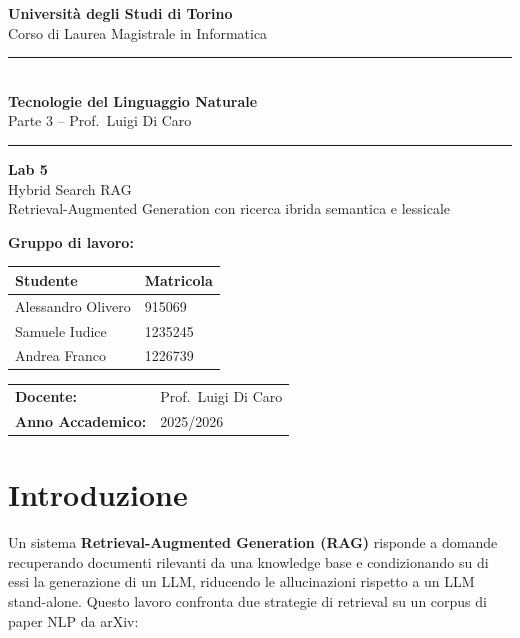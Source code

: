 \documentclass[12pt,a4paper]{article}
\newcommand{\HRule}{\rule{\linewidth}{0.5mm}}
\begin{document}
\raggedbottom

\begin{titlepage}
  \centering
  \vspace*{1.5cm}
  {\Large\textbf{Universit\`a degli Studi di Torino}\\[0.3em]
  Corso di Laurea Magistrale in Informatica}
  \vspace{1cm}
  \HRule\\[0.4em]
  {\LARGE\textbf{Tecnologie del Linguaggio Naturale}}\\[0.3em]
  {\large Parte 3 -- Prof.\ Luigi Di Caro}\\[0.2em]
  \HRule
  \vspace{1.2cm}
  {\huge\textbf{Lab 5}}\\[0.5em]
  {\LARGE Hybrid Search RAG}\\[0.4em]
  {\large Retrieval-Augmented Generation con ricerca ibrida semantica e lessicale}

  \vspace{2cm}
  {\large\textbf{Gruppo di lavoro:}}\\[0.8em]
  \begin{tabular}{ll}
    \toprule
    \textbf{Studente}    & \textbf{Matricola} \\
    \midrule
    Alessandro Olivero   & 915069  \\
    Samuele Iudice       & 1235245 \\
    Andrea Franco        & 1226739 \\
    \bottomrule
  \end{tabular}

  \vspace{1.5cm}
  \begin{tabular}{ll}
    \textbf{Docente:}          & Prof.\ Luigi Di Caro \\[0.3em]
    \textbf{Anno Accademico:}  & 2025/2026 \\
  \end{tabular}
  \vfill
\end{titlepage}

\tableofcontents
\newpage

\section{Introduzione}

Un sistema \textbf{Retrieval-Augmented Generation (RAG)} risponde a domande recuperando documenti rilevanti da una knowledge base e condizionando su di essi la generazione di un LLM, riducendo le allucinazioni rispetto a un LLM stand-alone. Questo lavoro confronta due strategie di retrieval su un corpus di paper NLP da arXiv:
\end{document}
